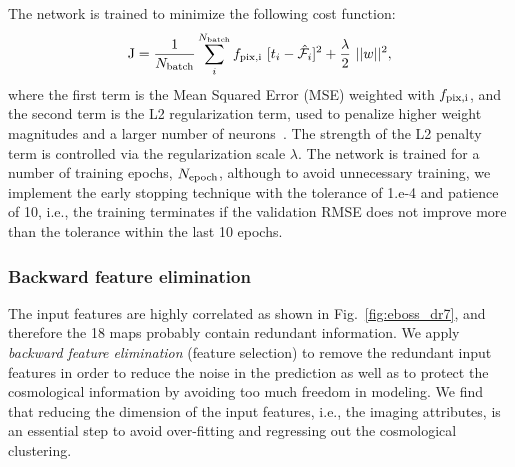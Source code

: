 \documentclass[fleqn, usenatbib]{mnras}
\begin{document}
The network is trained to minimize the following cost function:
\begin{equation}\label{eq:cost}
    \text{J} = \frac{1}{N_{{\rm batch}}}\sum_{i}^{N_{{\rm batch}}}f_{\rm pix, i}~[t_{i} - \hat{\mathcal{F}_{i}}]^{2} + \frac{\lambda}{2} ~ ||w||^{2} ,
\end{equation}   
%
where the first term is the Mean Squared Error (MSE) weighted with $f_{\rm pix,i}$, and the second term is the L2 regularization term, used to penalize higher weight magnitudes and a larger number of neurons~\citep{hoerl1970ridge}. The strength of the L2 penalty term is controlled via the regularization scale $\lambda$. The network is trained for a number of training epochs, $N_{{\rm epoch}}$, although to avoid unnecessary training, we implement the early stopping technique with the tolerance of 1.e-4 and patience of 10, i.e., the training terminates if the validation RMSE does not improve more than the tolerance within the last 10 epochs.\\

\subsubsection{Backward feature elimination}
    
The input features are highly correlated as shown in Fig.~\ref{fig:eboss_dr7}, and therefore the 18 maps probably contain redundant information.
We apply \textit{backward feature elimination} (feature selection) to remove the redundant input features in order to reduce the noise in the prediction as well as to protect the cosmological information by avoiding too much freedom in modeling. We find that reducing the dimension of the input features, i.e., the imaging attributes, is an essential step to avoid over-fitting and regressing out the cosmological clustering.\\
\end{document}
